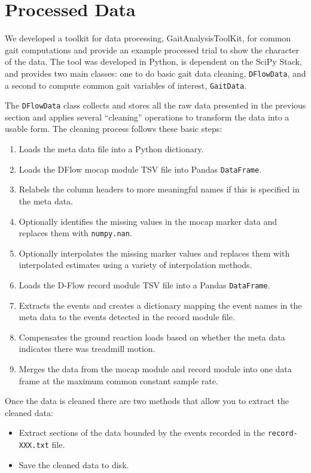\documentclass[10pt,a4paper,twocolumn]{article}
\begin{document}
\section*{Processed Data}

We developed a toolkit for data processing, GaitAnalysisToolKit, for common
gait computations and provide an example processed trial to show the character
of the data. The tool was developed in Python, is dependent on the SciPy Stack,
and provides two main classes: one to do basic gait data cleaning,
\verb|DFlowData|, and a second to compute common gait variables of interest,
\verb|GaitData|.

The \verb|DFlowData| class collects and stores all the raw data presented in
the previous section and applies several ``cleaning'' operations to transform
the data into a usable form. The cleaning process follows these basic steps:

\begin{enumerate}
  \item Loads the meta data file into a Python dictionary.
  \item Loads the DFlow mocap module TSV file into Pandas \verb|DataFrame|.
  \item Relabels the column headers to more meaningful names if this is
    specified in the meta data.
  \item Optionally identifies the missing values in the mocap marker data and
    replaces them with \verb|numpy.nan|.
  \item Optionally interpolates the missing marker values and replaces them
    with interpolated estimates using a variety of interpolation methods.
  \item Loads the D-Flow record module TSV file into a Pandas \verb|DataFrame|.
  \item Extracts the events and creates a dictionary mapping the event names in
    the meta data to the events detected in the record module file.
  \item Compensates the ground reaction loads based on whether the meta data
    indicates there was treadmill motion.
  \item Merges the data from the mocap module and record module into one data
    frame at the maximum common constant sample rate.
\end{enumerate}

Once the data is cleaned there are two methods that allow you to extract the
cleaned data:

\begin{itemize}
  \item Extract sections of the data bounded by the events recorded in the
    \verb|record-XXX.txt| file.
  \item Save the cleaned data to disk.
\end{itemize}
\end{document}
